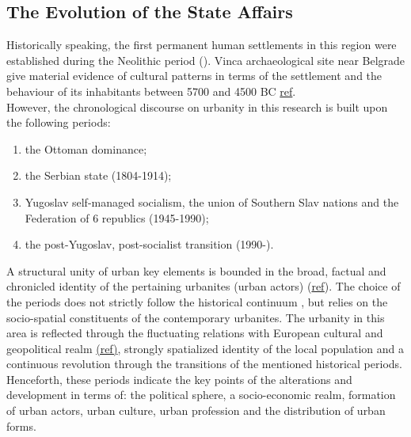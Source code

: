 \documentclass[11pt]{report}
\begin{document}
\subsection{The Evolution of the State Affairs}

Historically speaking, the first permanent human settlements in this region were established during the  Neolithic  period (\href{Krstic}{\citealt{krstic_planerski_1972}}). Vinca archaeological site near Belgrade give material evidence of cultural patterns in terms of the settlement and the behaviour of its inhabitants between 5700 and 4500 BC \href{ref}{ref}.
\\

However, the chronological discourse on urbanity in this research is built upon the following periods:

\begin{enumerate}
\item the Ottoman dominance;
\item the Serbian state (1804-1914);\footnotemark 
\item Yugoslav self-managed socialism, the union of Southern Slav nations and the Federation of 6 republics (1945-1990);
\item the post-Yugoslav, post-socialist transition (1990-).
\end{enumerate}


A structural unity of urban key elements is bounded in the broad, factual and chronicled identity of the pertaining urbanites (urban actors) (\href{ref}{ref}).
The choice of the periods does not strictly follow the historical continuum \footnotemark, but relies on the socio-spatial constituents of the contemporary urbanites. The urbanity in this area is reflected through the fluctuating relations with European cultural and geopolitical realm \href{ref}{(ref)}, strongly spatialized identity of the local population \href{ref}{\citealt{savic_where_2014}} and a continuous revolution through the transitions of the mentioned historical periods. Henceforth, these periods indicate the key points of the alterations and development in terms of: the political sphere, a socio-economic realm, formation of urban actors, urban culture, urban profession and the distribution of urban forms.
\end{document}
